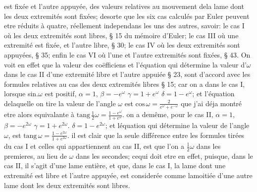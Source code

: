 \documentclass[11pt,a4paper]{article}
\begin{document}
est fixée et l'autre appuyée, des valeurs relatives au mouvement dela lame dont les
deux extremités sont fixées; desorte que les six cas calculés par Euler peuvent etre
réduits à quatre, réellement independans les uns des autres, savoir: le cas I où les
deux extremités sont libres, § 15 du mémoire d'Euler; le cas III où une extremité
est fixée, et l'autre libre, § 30; le cas IV où les deux extremités sont appuyées, § 35;
enfin le cas VI où l'une et l'autre extremités sont fixées, § 43. On voit en effet
que la valeur des coëfficiens et l'équation qui détermine la valeur d'$\omega$ dans
le cas II d'une extremité libre et l'autre appuiée § 23, sont d'accord avec les
formules relatives au cas des deux extremités libres § 15; car on a dans le cas I,
lorsque sin.$\omega$ est positif, $\alpha = 1$, $\beta = -e^{\omega}$ $\gamma = 1 + e^{\omega}$ $\delta = 1 - e^{\omega}$; et l'équation delaquelle
on tire la valeur de l'angle $\omega$ est $\text{cos}\,\omega = \frac{2}{e^{\omega} + e^{-\omega}}$ que j'ai déja montré etre
alors equivalante à $\text{tang}\,\frac{1}{2}\omega = \frac{1 - e^{\omega}}{1 + e^{\omega}}$. on a demême, pour le cas II, $\alpha = 1$, $\beta = -e^{2\omega}$
$\gamma = 1 + e^{2\omega}$. $\delta = 1 - e^{2\omega}$; et léquation qui détermine la valeur de l'angle $\omega$, est
$\text{tang}\,\omega = \frac{1 - e^{2\omega}}{1 + e^{2\omega}}$. il est clair que la seule différence entre les formules tirées du
cas I et celles qui appartiennent au cas II, est que l'on a $\frac{1}{2}\omega$ dans les premieres,
au lieu de $\omega$ dans les secondes; cequi doit etre en effet, puisque, dans le
cas II, il s'agit d'une lame entière, et que, dans le cas I, la lame dont une
extremité est libre et l'autre appuyée, est considerée comme lamoitiée d'une
autre lame dont les deux extremités sont libres.
\end{document}
